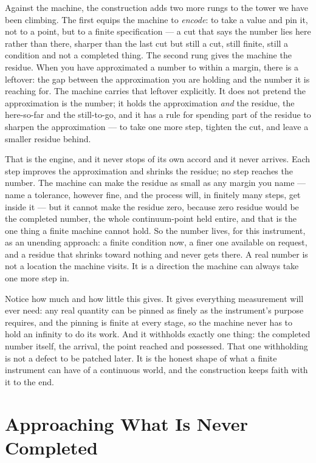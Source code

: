 Against the machine, the construction adds two more rungs to the tower we have been climbing. The first equips
the machine to \emph{encode}: to take a value and pin it, not to a point, but to a finite specification --- a
cut that says the number lies here rather than there, sharper than the last cut but still a cut, still finite,
still a condition and not a completed thing. The second rung gives the machine the residue. When you have
approximated a number to within a margin, there is a leftover: the gap between the approximation you are holding
and the number it is reaching for. The machine carries that leftover explicitly. It does not pretend the
approximation is the number; it holds the approximation \emph{and} the residue, the here-so-far and the
still-to-go, and it has a rule for spending part of the residue to sharpen the approximation --- to take one more
step, tighten the cut, and leave a smaller residue behind.

That is the engine, and it never stops of its own accord and it never arrives. Each step improves the
approximation and shrinks the residue; no step reaches the number. The machine can make the residue as small as
any margin you name --- name a tolerance, however fine, and the process will, in finitely many steps, get inside
it --- but it cannot make the residue zero, because zero residue would be the completed number, the whole
continuum-point held entire, and that is the one thing a finite machine cannot hold. So the number lives, for
this instrument, as an unending approach: a finite condition now, a finer one available on request, and a residue
that shrinks toward nothing and never gets there. A real number is not a location the machine visits. It is a
direction the machine can always take one more step in.

Notice how much and how little this gives. It gives everything measurement will ever need: any real quantity can
be pinned as finely as the instrument's purpose requires, and the pinning is finite at every stage, so the
machine never has to hold an infinity to do its work. And it withholds exactly one thing: the completed number
itself, the arrival, the point reached and possessed. That one withholding is not a defect to be patched later.
It is the honest shape of what a finite instrument can have of a continuous world, and the construction keeps
faith with it to the end.

\section{Approaching What Is Never Completed}

